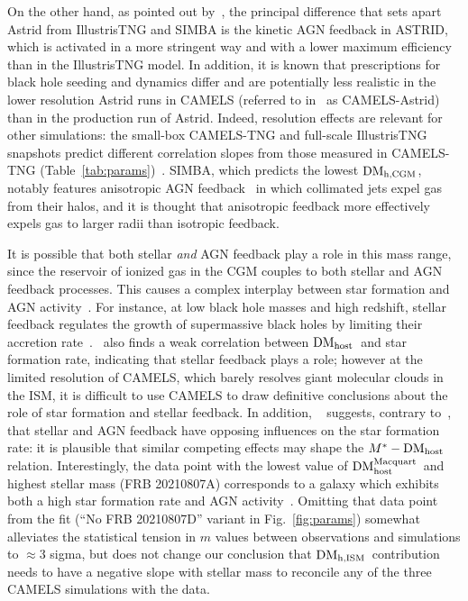 \documentclass[twocolumn,linenumbers]{aastex631}
\newcommand{\dmh}{\ensuremath{{\rm DM}_\textrm{host}}}
\newcommand{\dmhm}{\ensuremath{{\rm DM}_\textrm{host}^\textrm{Macquart}}}
\newcommand{\dmhism}{\ensuremath{{\rm DM}_\textrm{h,ISM}}}
\newcommand{\dmhcgm}{\ensuremath{{\rm DM}_\textrm{h,CGM}}}
\begin{document}
On the other hand, as pointed out by~\citet{ni2023camels}, the principal difference that sets apart Astrid from IllustrisTNG and SIMBA is the kinetic AGN feedback in ASTRID, which is activated in a more stringent way and with a lower maximum efficiency than in the IllustrisTNG model. In addition, it is known that prescriptions for black hole seeding and dynamics differ and are potentially less realistic in the lower resolution Astrid runs in CAMELS (referred to in~\citep{ni2023camels} as CAMELS-Astrid) than in the production run of Astrid. 
Indeed, resolution effects are relevant for other simulations: the small-box CAMELS-TNG and full-scale IllustrisTNG snapshots predict different correlation slopes from those measured in CAMELS-TNG (Table~\ref{tab:params})~\citep[see Fig. 5 in][]{mo2023dispersion}. SIMBA, which predicts the lowest \dmhcgm, notably features anisotropic AGN feedback~\citep{anglesalcazar2017black,dave2019simba,khrykin2024cosmic} in which collimated jets expel gas from their halos, and it is thought that anisotropic feedback more effectively expels gas to larger radii than isotropic feedback. 

It is possible that both stellar \emph{and} AGN feedback play a role in this mass range, since the reservoir of ionized gas in the CGM couples to both stellar and AGN feedback processes. 
This causes a complex interplay between star formation and AGN activity~\citep{2025ApJ...980...61M}. 
For instance, at low black hole masses and high redshift, stellar feedback regulates the growth of supermassive black holes by limiting their accretion rate~\citep{}.~\citet{theis2024galaxy} also finds a weak correlation between \dmh\ and star formation rate, indicating that stellar feedback plays a role; however at the limited resolution of CAMELS, which barely resolves giant molecular clouds in the ISM, it is difficult to use CAMELS to draw definitive conclusions about the role of star formation and stellar feedback.
In addition, ~\citet{booth2013interaction} suggests, contrary to~\citet{newton2013study}, that stellar and AGN feedback have opposing influences on the star formation rate: it is plausible that similar competing effects may shape the $M^*-\dmh$ relation. 
Interestingly, the data point with the lowest value of \dmhm\ and highest stellar mass (FRB 20210807A) corresponds to a galaxy which exhibits both a high star formation rate and AGN activity~\citep{gordon2023demographics}. 
Omitting that data point from the fit (``No FRB 20210807D'' variant in Fig.~\ref{fig:params}) somewhat alleviates the statistical tension in $m$ values between observations and simulations to $\approx 3$ sigma, but does not change our conclusion that \dmhism\ contribution needs to have a negative slope with stellar mass to reconcile any of the three CAMELS simulations with the data.
\end{document}
